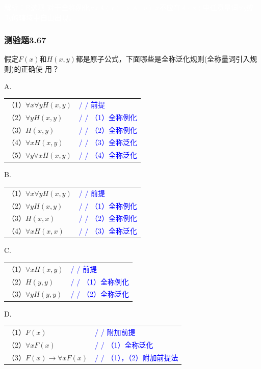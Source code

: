 \documentclass[UTF8, heading=true]{ctexart}
\begin{document}
\textcolor{white}{解析：B选项 对于全称例化$\forall x A(x) \Longrightarrow A(y)$,$x$不应在$A(x)$中任意量词$\forall y$或$\exists y$的辖域中自由出现。}


\subsubsection{测验题3.67}
假定$F(x)$和$H(x,y)$都是原子公式，下面哪些是全称泛化规则(全称量词引入规则)的正确使
用？


A. 

\begin{tabular}{ll}
  （1）$\forall x \forall y H(x, y)$ & \textcolor{blue}{/ / 前提} \\
  （2）$\forall y H(x, y)$ & \textcolor{blue}{/ / （1）全称例化} \\
  （3）$H(x, y)$ & \textcolor{blue}{/ / （2）全称例化} \\
  （4）$\forall x H(x, y)$ & \textcolor{blue}{/ / （3）全称泛化} \\
  （5）$\forall y \forall x H(x, y)$ & \textcolor{blue}{/ / （4）全称泛化}
\end{tabular}


B.

\begin{tabular}{ll}
  （1）$\forall x \forall y H(x, y)$ & \textcolor{blue}{/ / 前提} \\
  （2）$\forall y H(x, y)$ & \textcolor{blue}{/ / （1）全称例化} \\
  （3）$H(x, x)$ & \textcolor{blue}{/ / （2）全称例化} \\
  （4）$\forall x H(x, x)$ & \textcolor{blue}{/ / （3）全称泛化}
\end{tabular}


C.

\begin{tabular}{ll}
  （1）$\forall x H(x, y)$ & \textcolor{blue}{/ / 前提} \\
  （2）$H(y, y)$ & \textcolor{blue}{/ / （1）全称例化} \\
  （3）$\forall y H(y, y)$ & \textcolor{blue}{/ / （2）全称泛化}
\end{tabular}


D.

\begin{tabular}{ll}
  （1）$F(x)$ & \textcolor{blue}{/ / 附加前提} \\
  （2）$\forall x F(x)$ & \textcolor{blue}{/ / （1）全称泛化} \\
  （3）$F(x) \rightarrow \forall x F(x)$ & \textcolor{blue}{/ / （1），（2）附加前提法}
\end{tabular}
\end{document}
